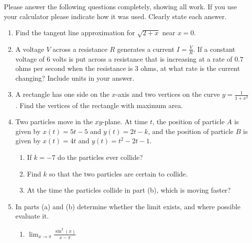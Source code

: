\documentclass[11pt]{article}
\begin{document}
\drawtitle

\noindent Please answer the following questions completely, showing all work.
If you use your calculator please indicate how it was used.  Clearly
state each answer.

\begin{enumerate}
\item Find the tangent line approximation for $\sqrt{2 + x}$ near
  $x=0$.

  \vfill

\item A voltage $V$ across a resistance $R$ generates a current
  $I=\frac{V}{R}$.  If a constant voltage of 6 volts is put across a
  resistance that is increasing at a rate of $0.7$ ohms per second
  when the resistance is 3 ohms, at what rate is the current
  changing?  Include units in your answer.

  \vfill
  \newpage
  
\item A rectangle has one side on the $x$-axis and two vertices on the
  curve $y=\frac{1}{1 + x^2}$. Find the vertices of the rectangle with
  maximum area.

  \newpage

\item Two particles move in the $xy$-plane.  At time $t$, the position
  of particle $A$ is given by $x(t) = 5t - 5$ and $y(t) = 2t - k$, and
  the position of particle $B$ is given by $x(t) = 4t$ and $y(t) = t^2
  - 2t - 1$.
  \begin{enumerate}
  \item If $k=-7$ do the particles ever collide?
    

    \vfill
    
  \item Find $k$ so that the two particles are certain to collide.

    \vfill
    
  \item At the time the particles collide in part (b), which is moving
    faster?

    \vfill
  \end{enumerate}
  \newpage

\item In parts (a) and (b) determine whether the limit exists, and
  where possible evaluate it.
  \begin{enumerate}
  \item $\displaystyle\lim_{x\to \pi}\frac{\sin^2(x)}{x-\pi}$


\end{enumerate}
\end{enumerate}
\end{document}
